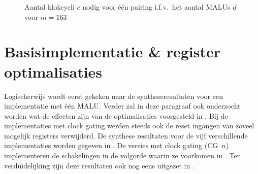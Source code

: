 \begin{figure}[h]
	\centering
		\caption{Aantal klokcycli $c$ nodig voor \'e\'en pairing i.f.v.\ het aantal MALUs $d$ voor $m = 163$\label{figuur-resultaten-multi-cycles}}
\end{figure}

\section{Basisimplementatie \& register optimalisaties\label{section-resultaten-basisimplementatie}}

Logischerwijs wordt eerst gekeken naar de syntheseresultaten voor een implementatie met \'e\'en MALU. Verder zal in deze paragraaf ook onderzocht worden wat de effecten zijn van de optimalisaties voorgesteld in . Bij de implementaties met clock gating werden steeds ook de reset ingangen van zoveel mogelijk registers verwijderd. De synthese resultaten voor de vijf verschillende implementaties worden gegeven in . De versies met clock gating (CG~$n$) implementeren de schakelingen in de volgorde waarin ze voorkomen in . Ter verduidelijking zijn deze resultaten ook nog eens uitgezet in .


